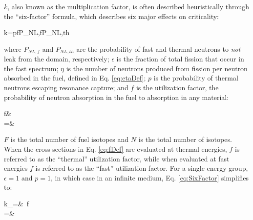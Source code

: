 \(k\), also known as the multiplication factor, is often described heuristically through the ``six-factor'' formula, which describes six major effects on criticality:

\beq
\label{eq:SixFactor}
k=\epsilon p\eta fP_{NL,f}P_{NL,th}
\eeq

where \(P_{NL,f}\) and \(P_{NL,th}\) are the probability of fast and thermal neutrons to {\it not} leak from the domain, respectively; \(\epsilon\) is the fraction of total fission that occur in the fast spectrum; \(\eta\) is the number of neutrons produced from fission per neutron absorbed in the fuel, defined in Eq. \eqref{eq:etaDef}; \(p\) is the probability of thermal neutrons escaping resonance capture; and \(f\) is the utilization factor, the probability of neutron absorption in the fuel to absorption in any material:

 \beqa
 \label{eq:fDef}
 f\equiv&\ \\
 =&\ 
 \eeqa
 
\(F\) is the total number of fuel isotopes and \(N\) is the total number of isotopes. When the cross sections in Eq. \eqref{eq:fDef} are evaluated at thermal energies, \(f\) is referred to as the ``thermal'' utilization factor, while when evaluated at fast energies \(f\) is referred to as the ``fast'' utilization factor. For a single energy group, \(\epsilon=1\) and \(p=1\), in which case in an infinite medium, Eq. \eqref{eq:SixFactor} simplifies to:

\beqa
\label{eq:InfKOneGroup}
k_\infty=&\ \eta f\\
=&\ 
\eeqa
 

